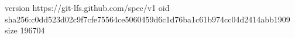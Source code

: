 version https://git-lfs.github.com/spec/v1
oid sha256:c0dd523d02c9f7cfe75564ce5060459d6c1d76ba1c61b974cc04d2414abb1909
size 196704
